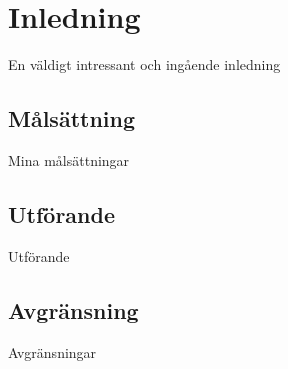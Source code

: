 \section{Inledning}

En väldigt intressant och ingående inledning

\subsection{Målsättning}

Mina målsättningar

\subsection{Utförande}

Utförande

\subsection{Avgränsning}

Avgränsningar

